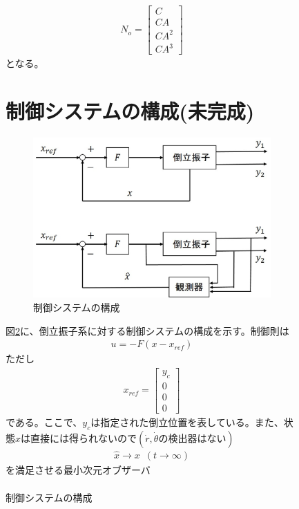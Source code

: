 \documentclass[a4j,11pt,twoside]{ujbook}
\begin{document}
\begin{figure}[htbp]
\begin{center}
		\begin{eqnarray*}
			N_o = \left[
			\begin{array}{c}
				C\\
				CA\\
				CA^2\\
				CA^{3}
			\end{array}
			\right]
		\end{eqnarray*}
		となる。
	\section{制御システムの構成(未完成)}
	
		\begin{figure}[htbp]
			\begin{center}
				\includegraphics[width = 0.6 \linewidth]{system.eps}
				\caption{制御システムの構成}
				\label{fig:制御システムの構成}
			\end{center}
		\end{figure}
		図\ref{fig:制御システムの構成}に、倒立振子系に対する制御システムの構成を示す。制御則は
		\begin{eqnarray*}
			u = -F(x-x_{ref})
		\end{eqnarray*}
		ただし
		\begin{eqnarray*}
			x_{ref} = \left[
			\begin{array}{c}
				y_c\\
				0\\
				0\\
				0
			\end{array}
			\right]
		\end{eqnarray*}
		である。ここで、$y_c$は指定された倒立位置を表している。また、状態$x$は直接には得られないので$(\dot{r},\dot{\theta}の検出器はない)$
		\begin{eqnarray*}
			\hat{x} \to x \,\,\, (t \to \infty)
			\label{eq:xhat,x}
		\end{eqnarray*}
		を満足させる最小次元オブザーバ
		\begin{eqnarray}

\end{eqnarray}
\end{center}
\end{figure}
\end{document}
